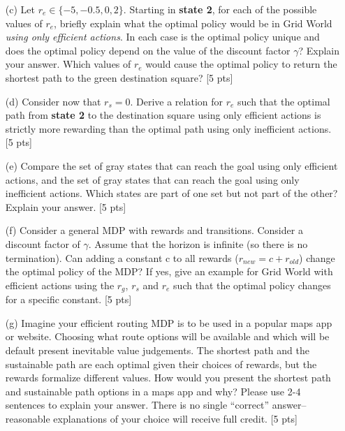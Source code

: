 \begin{enumerate}

\item[(c)] Let $r_e \in \{-5,-0.5,0,2\}$. Starting in \textbf{state 2}, for each of the possible values of $r_e$, briefly explain what the optimal policy would be in Grid World \textit{using only efficient actions}. In each case is the optimal policy unique and does the optimal policy depend on the value of the discount factor $\gamma$? Explain your answer. Which values of $r_e$ would cause the optimal policy to return the shortest path to the green destination square?  [5 pts]

\item[(d)] Consider now that $r_s = 0$. Derive a relation for $r_e$ such that the optimal path from \textbf{state 2} to the destination square using only efficient actions is strictly more rewarding than the optimal path using only inefficient actions.  [5 pts]

\item[(e)] Compare the set of gray states that can reach the goal using only efficient actions, and the set of gray states that can reach the goal using only inefficient actions. Which states are part of one set but not part of the other? Explain your answer. [5 pts]

\item [(f)] Consider a general MDP with rewards and transitions. Consider a discount factor of $\gamma$. Assume that the horizon is infinite (so there is no termination). Can adding a constant c to all rewards ($r_{new} = c + r_{old}$) change the optimal policy of the MDP? If yes, give an example for Grid World with efficient actions using the $r_g$, $r_s$ and $r_e$ such that the optimal policy changes for a specific constant. [5 pts]

\item[(g)]
Imagine your efficient routing MDP is to be used in a popular maps app or website.  Choosing what route options will be available and which will be default present inevitable value judgements. The shortest path and the sustainable path are each optimal given their choices of rewards, but the rewards formalize different values.  How would you present the shortest path and sustainable path options in a maps app and why? Please use 2-4 sentences to explain your answer. There is no single ``correct'' answer-- reasonable explanations of your choice will receive full credit. [5 pts]


\end{enumerate}
